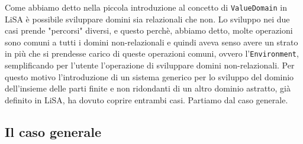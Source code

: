 Come abbiamo detto nella piccola introduzione al concetto di \texttt{ValueDomain} in LiSA è possibile sviluppare domini sia relazionali che non. Lo sviluppo nei due casi prende "percorsi" diversi, e questo perchè, abbiamo detto, molte operazioni sono comuni a tutti i domini non-relazionali e quindi aveva senso avere un strato in più che si prendesse carico di queste operazioni comuni, ovvero l'\texttt{Environment}, semplificando per l'utente l'operazione di sviluppare domini non-relazionali. Per questo motivo l'introduzione di un sistema generico per lo sviluppo del dominio dell'insieme delle parti finite e non ridondanti di un altro dominio astratto, già definito in LiSA, ha dovuto coprire entrambi casi. Partiamo dal caso generale. 

\subsection{Il caso generale}

